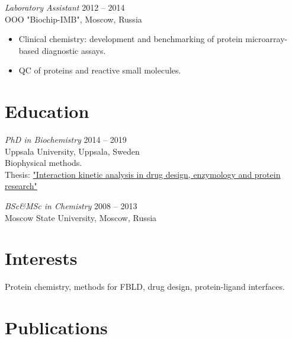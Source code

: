 \documentclass[margin]{res}
\begin{document}
\begin{resume}
{\sl Laboratory Assistant} \hfill 2012 -- 2014 \\
OOO "Biochip-IMB", Moscow, Russia
\begin{itemize}
\setlength\itemsep{0em}
\item Clinical chemistry: development and benchmarking of protein microarray-based diagnostic assays.
\item QC of proteins and reactive small molecules.
\end{itemize}
 
\section{Education} {\sl PhD in Biochemistry} \hfill 2014 -- 2019 \\
Uppsala University, Uppsala, Sweden \\
Biophysical methods. \\
Thesis: \href{http://uu.diva-portal.org/smash/record.jsf?pid=diva2%3A1256395&dswid=214}{"Interaction kinetic analysis in drug design, enzymology and protein research"}

{\sl BSc\&MSc in Chemistry} \hfill 2008 -- 2013 \\
Moscow State University, Moscow, Russia \\
                 
\section{Interests} Protein chemistry, methods for FBLD, drug design, protein-ligand interfaces.
 

\newpage

\section{Publications}
\nocite{*}
\printbibliography[heading=none]
\end{resume}
\end{document}
